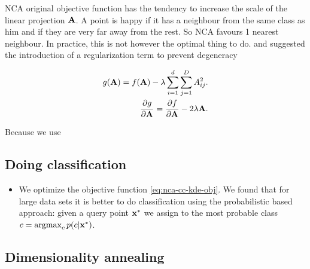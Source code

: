   NCA original objective function has the tendency to increase the scale of the linear projection $\mathbf{A}$. A point is happy if it has a neighbour from the same class as him and if they are very far away from the rest. So NCA favours 1 nearest neighbour. In practice, this is not however the optimal thing to do. \citet{butman2008} and \citet{singh2010} suggested the introduction of a regularization term to prevent degeneracy

\begin{align}
            g(\mathbf{A}) = f(\mathbf{A}) - \lambda \sum_{i=1}^d\sum_{j=1}^D A_{ij}^2.\\
            \frac{\partial g}{\partial \mathbf{A}} = \frac{\partial f}{\partial \mathbf{A}} -
2\lambda\mathbf{A}.
        \end{align}

  Because we use 

%         

\subsection{Doing classification}
\label{subsec:doing-classification}

\begin{itemize}
    \item We optimize the objective function
        \ref{eq:nca-cc-kde-obj}. We found that for large data
        sets it is better to do classification using the
        probabilistic based approach: given a query point
        $\mathbf{x}^*$ we assign to the most probable class $c =
        \operatorname{argmax}_cp(c|\mathbf{x}^*)$.
\end{itemize}

\subsection{Dimensionality annealing}
\label{subsec:dimensionality-annealing}


